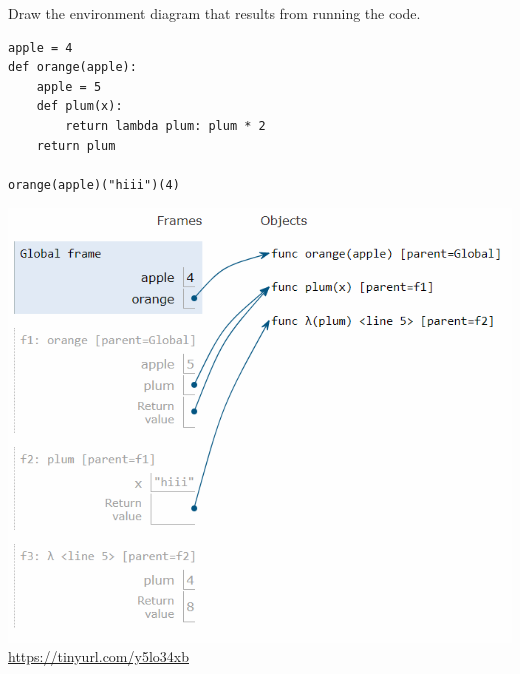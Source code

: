 \begin{blocksection}
\question Draw the environment diagram that results from running the code.

\begin{lstlisting}
apple = 4
def orange(apple):
    apple = 5
    def plum(x):
        return lambda plum: plum * 2
    return plum

orange(apple)("hiii")(4)
\end{lstlisting}

\begin{solution}[2in]
\includegraphics[scale=0.5]{apple.png}
\newline
\url{https://tinyurl.com/y5lo34xb}
\end{solution}
\end{blocksection}

    